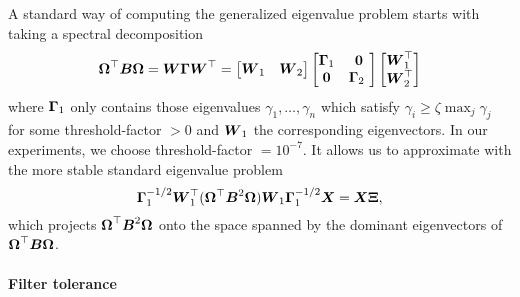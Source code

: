 A standard way of computing the generalized eigenvalue problem 
starts with taking a spectral decomposition
\begin{equation}
    \boldsymbol{\Omega}^{\top} \boldsymbol{B} \boldsymbol{\Omega}
    = \boldsymbol{W} \boldsymbol{\Gamma} \boldsymbol{W}^{\top}
    = \begin{bmatrix} \boldsymbol{W}_1 & \boldsymbol{W}_2 \end{bmatrix} 
    \begin{bmatrix} \boldsymbol{\Gamma}_1 & \boldsymbol{0} \\ \boldsymbol{0} & \boldsymbol{\Gamma}_2 \ \end{bmatrix} 
    \begin{bmatrix} \boldsymbol{W}_1^{\top} \\ \boldsymbol{W}_2^{\top} \end{bmatrix}
\end{equation}
where $\boldsymbol{\Gamma}_1$ only contains those eigenvalues $\gamma_1, \dots, \gamma_n$
which satisfy $\gamma_i \geq \zeta \max_{j} \gamma_j$ 
for some \gls{threshold-factor} $>0$ and $\boldsymbol{W}_1$ the corresponding
eigenvectors. In our experiments, we choose \gls{threshold-factor} $=10^{-7}$.
It allows us to approximate 
with the more stable standard eigenvalue problem
\begin{equation}
    \boldsymbol{\Gamma}_1^{-1/2} \boldsymbol{W}_1^{\top} (\boldsymbol{\Omega}^{\top} \boldsymbol{B}^2 \boldsymbol{\Omega}) \boldsymbol{W}_1 \boldsymbol{\Gamma}_1^{-1/2} \boldsymbol{X} = \boldsymbol{X} \boldsymbol{\Xi},
    \label{equ:3-nystrom-converted-generalized-eigenvalue-problem}
\end{equation}
which projects $\boldsymbol{\Omega}^{\top} \boldsymbol{B}^2 \boldsymbol{\Omega}$ onto the space spanned
by the dominant eigenvectors of
$\boldsymbol{\Omega}^{\top} \boldsymbol{B} \boldsymbol{\Omega}$.\\

\paragraph{Filter tolerance}

